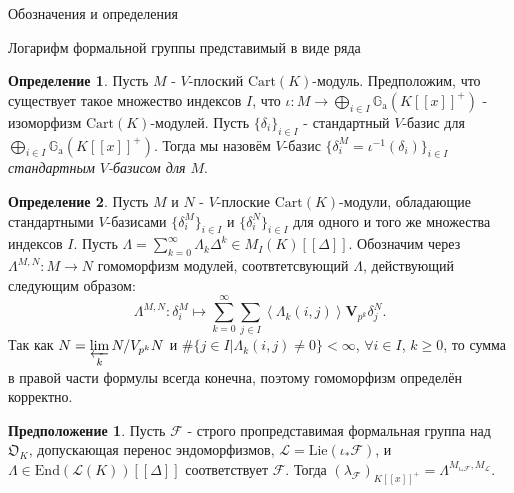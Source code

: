 \documentclass[a4paper,14pt]{extarticle}
\theoremstyle{definition}
\newtheorem{definition}{Определение}[section]
\newtheorem{guess}{Предположение}
\newcommand{\Cart}{\mathrm{Cart}}
\newcommand{\End}[1]{\mathrm{End}\left(#1\right)}
\newcommand{\Lie}[1]{\mathrm{Lie}\left(#1\right)}
\newcommand{\modhom}[3]{{#1}^{{\scriptscriptstyle #2, #3 }}}
\newcommand{\bG}{\mathbb{G}}
\newcommand{\fO}{\mathfrak{O}}
\newcommand{\oH}[1]{\left\langle #1 \right\rangle}
\newcommand{\oV}{\mathbf{V}}
\newcommand{\sF}{\mathscr{F}}
\newcommand{\sL}{\mathscr{L}}
\newcommand{\Ga}{\bG_{\mathrm{a}}}
\begin{document}
\begin{section}{Обозначения и определения}
\begin{subsection}{Логарифм формальной группы представимый в виде ряда}
\begin{definition}
    Пусть $M$ - $V$-плоский $\Cart(K)$-модуль. Предположим, что существует такое множество индексов $I$, что ${ \iota : M \rightarrow \bigoplus\limits_{i \in I} \Ga(K[[x]]^+) }$ - изоморфизм $\Cart(K)$-модулей. Пусть $\{ \delta_i \}_{i \in I}$ - стандартный $V$-базис для ${ \bigoplus\limits_{i \in I} \Ga(K[[x]]^+) }$. Тогда мы назовём $V$-базис ${ \{ \delta^M_i = \iota^{-1}(\delta_i) \}_{i \in I} }$ \textit{стандартным $V$-базисом для $M$}.
\end{definition}

\begin{definition}
    Пусть $M$ и $N$ - $V$-плоские $\Cart(K)$-модули, обладающие стандартными $V$-базисами ${ \{ \delta^M_i \}_{i \in I} }$ и ${ \{ \delta^N_i \}_{i \in I} }$ для одного и того же множества индексов $I$. Пусть ${ \Lambda = \sum\limits_{k = 0}^\infty \Lambda_k \Delta^k \in M_I(K)[[\Delta]] }$. Обозначим через ${ \modhom{\Lambda}{M}{N} : M \rightarrow N }$ гомоморфизм модулей, соотвтетсвующий $\Lambda$, действующий следующим образом:
    \begin{equation*}
        \modhom{\Lambda}{M}{N} :
        \delta^M_i \mapsto
        \sum_{k = 0}^\infty
        \sum_{j \in I}
        \oH{\Lambda_k(i, j)} \oV_{p^k} \delta^N_j.
    \end{equation*}
    Так как ${ N = \varprojlim\limits_k N / V_{p^k} N }$ и ${ \#\{ j \in I | \Lambda_k(i, j) \neq 0 \} < \infty }$, ${ \forall i \in I }$, ${ k \geq 0 }$, то сумма в правой части формулы всегда конечна, поэтому гомоморфизм определён корректно.
\end{definition}

\begin{guess}
    Пусть $\sF$ - строго пропредставимая формальная группа над $\fO_K$, допускающая перенос эндоморфизмов, ${ \sL = \Lie{\iota_* \sF} }$, и ${ \Lambda \in \End{\sL(K)}[[\Delta]] }$ соответствует $\sF$. Тогда ${ \left( \lambda_\sF \right)_{K[[x]]^+} = \modhom{\Lambda}{M_{\iota_* \sF}}{M_\sL} }$.
\end{guess}

\end{subsection}

\end{section}

\newpage
\end{document}
